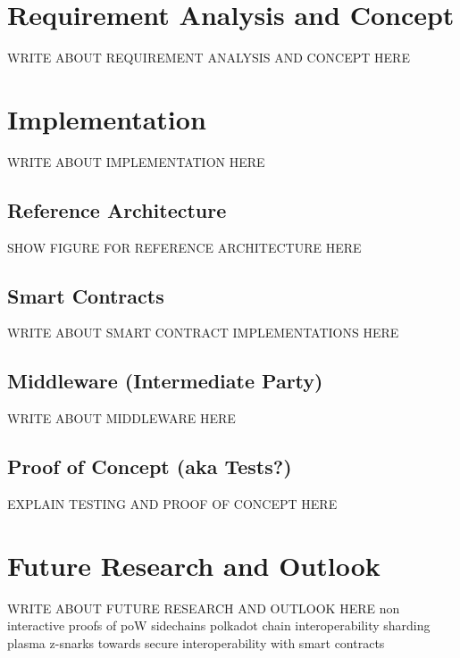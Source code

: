 
\chapter{Requirement Analysis and Concept}
\label{ch:chapter04}
WRITE ABOUT REQUIREMENT ANALYSIS AND CONCEPT HERE

\chapter{Implementation}
\label{ch:chapter05}
WRITE ABOUT IMPLEMENTATION HERE

\section{Reference Architecture}
\label{sec:chapter05:ref_architecture}

SHOW FIGURE FOR REFERENCE ARCHITECTURE HERE
%
%
\section{Smart Contracts}
\label{sec:chapter05:smartcontracts}
WRITE ABOUT SMART CONTRACT IMPLEMENTATIONS HERE

\section{Middleware (Intermediate Party)}
\label{sec:chapter05:middleware}
WRITE ABOUT MIDDLEWARE HERE

\section{Proof of Concept (aka Tests?)}
\label{sec:chapter05:poc}
EXPLAIN TESTING AND PROOF OF CONCEPT HERE

\chapter{Future Research and Outlook}
\label{ch:chapter06}
WRITE ABOUT FUTURE RESEARCH AND OUTLOOK HERE
non interactive proofs of poW \cite{kiayias2017non} sidechains \cite{kiayias2019proof} polkadot \cite{wood2016polkadot}  chain interoperability \cite{buterin2016chain} sharding \cite{buterin2017sharding} plasma \cite{poon2017plasma} z-snarks \cite{garoffolo2020zendoo} towards secure interoperability with smart contracts \cite{dagher2017towards}

